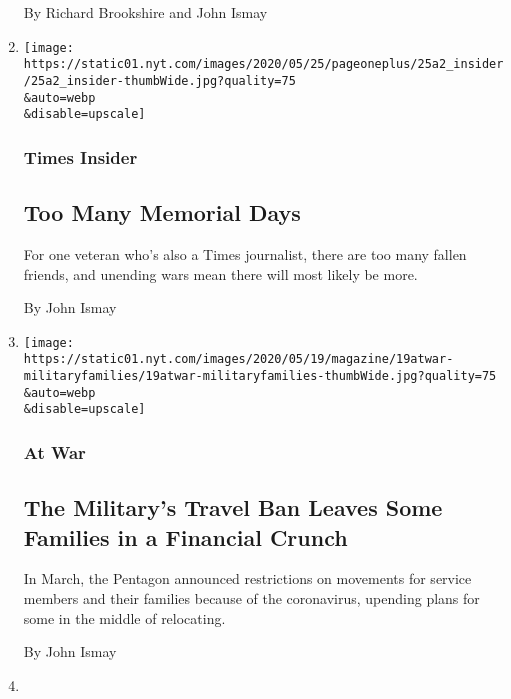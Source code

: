 \begin{enumerate}
  By Richard Brookshire and John Ismay
\item
  \href{/2020/05/24/reader-center/too-many-memorial-days.html}{}

  \texttt{[image: https://static01.nyt.com/images/2020/05/25/pageoneplus/25a2\_insider/25a2\_insider-thumbWide.jpg?quality=75\\\&auto=webp\\\&disable=upscale]}

  \hypertarget{times-insider}{%
  \subsubsection{Times Insider}\label{times-insider}}

  \hypertarget{too-many-memorial-days}{%
  \subsection{Too Many Memorial Days}\label{too-many-memorial-days}}

  For one veteran who's also a Times journalist, there are too many
  fallen friends, and unending wars mean there will most likely be more.

  By John Ismay
\item
  \href{/2020/05/19/magazine/military-travel-coronavirus.html}{}

  \texttt{[image: https://static01.nyt.com/images/2020/05/19/magazine/19atwar-militaryfamilies/19atwar-militaryfamilies-thumbWide.jpg?quality=75\\\&auto=webp\\\&disable=upscale]}

  \hypertarget{at-war-2}{%
  \subsubsection{At War}\label{at-war-2}}

  \hypertarget{the-militarys-travel-ban-leaves-some-families-in-a-financial-crunch}{%
  \subsection{The Military's Travel Ban Leaves Some Families in a
  Financial
  Crunch}\label{the-militarys-travel-ban-leaves-some-families-in-a-financial-crunch}}

  In March, the Pentagon announced restrictions on movements for service
  members and their families because of the coronavirus, upending plans
  for some in the middle of relocating.

  By John Ismay
\item
  \href{/interactive/2020/05/07/magazine/ve-day-anniversary.html}{}


\end{enumerate}
